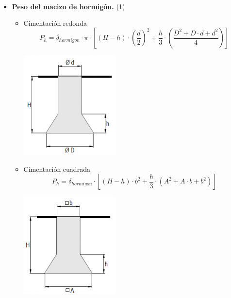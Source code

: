 \documentclass{article}
\begin{document}
            
            \begin{itemize}
                \item\textbf{ Peso del macizo de hormigón.} (1)
                    \begin{itemize}
                        \item Cimentación redonda
                        \begin{equation*}
                        P_h = \delta_{hormigon} \cdot \pi \cdot\left[(H-h)\cdot\left(\frac{d}{2}\right)^2 + \frac{h}{3}\cdot\left(\frac{D^2+D\cdot d + d^2}{4}\right)\right]
                        \end{equation*}
                        \begin{center}
                            \includegraphics[scale = 0.5]{assets/img/Patas Separadas/cimentacion circular.png}
                        \end{center}
                        \item Cimentación cuadrada
                         \begin{equation*}
                        P_h = \delta_{hormigon} \cdot\left[(H-h)\cdot b^2 + \frac{h}{3} \cdot \left(A^2 +A\cdot b + b^2\right)\right]
                        \end{equation*}
                        \begin{center}
                            \includegraphics[scale = 0.5]{assets/img/Patas Separadas/cimentacion cuadrada.png}
                        \end{center}
                    \end{itemize}
                    

\end{itemize}
\end{document}
